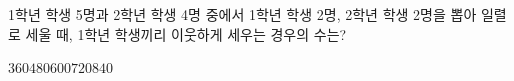 1학년 학생 5명과 2학년 학생 4명 중에서 1학년 학생 2명, 2학년 학생 2명을 뽑아 일렬로 세울 때, 1학년 학생끼리 이웃하게 세우는 경우의 수는?
\begin{choices32}{$360$}{$480$}{$600$}{$720$}{$840$}\end{choices32}
